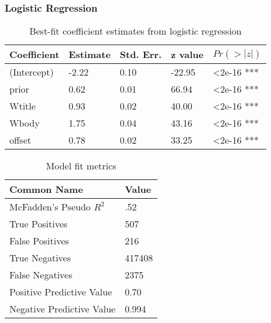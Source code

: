 \documentclass[10pt,letterpaper]{article}
\begin{document}
\subsubsection{Logistic Regression}

\vspace{-1em}

\renewcommand{\arraystretch}{1}
\renewcommand{\tabcolsep}{1mm}
\begin{table}[!ht]
  \begin{center}
    \caption{Best-fit coefficient estimates from logistic regression}
    \label{tab:coeffs}
    \vskip 0.12in
    \begin{tabular}{lllll}
      \hline
      Coefficient & 	Estimate &	Std. Err. &	z value &	$Pr(>|z|)$  \\
      \hline
      (Intercept) &	-2.22 &		0.10 &		-22.95 &	\textless2e-16 *** \\
      prior &		0.62 & 		0.01 &		66.94 & 	\textless2e-16 *** \\
      Wtitle &		0.93 &		0.02 &		40.00 &		\textless2e-16 *** \\
      Wbody &		1.75 &		0.04 &		43.16 &		\textless2e-16 *** \\
      offset &		0.78 &		0.02 &		33.25 &		\textless2e-16 *** \\
      \hline
    \end{tabular}
  \end{center}
\end{table}

\renewcommand{\arraystretch}{1}
\renewcommand{\tabcolsep}{3mm}
\begin{table}[!ht]
  \begin{center}
    \caption{Model fit metrics}
    \label{tab:fits}
    \vskip 0.12in
    \begin{tabular}{ll}
      \hline
      Common Name &  Value	\\
      \hline
      McFadden's Pseudo $R_{}^{2}$ &	.52 \\
      True Positives &			507 \\
      False Positives &			216 \\
      True Negatives &			\num{417408} \\
      False Negatives &			\num{2375} \\
      Positive Predictive Value &	0.70 \\
      Negative Predictive Value &	0.994 \\
      \hline
    \end{tabular}
  \end{center}
\end{table}
\end{document}
